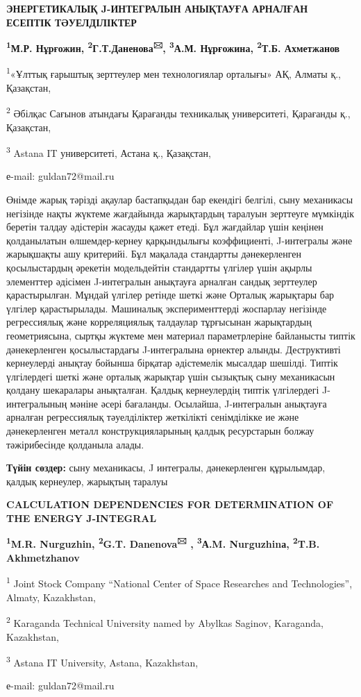 \begin{center}
{\large\bfseries ЭНЕРГЕТИКАЛЫҚ J-ИНТЕГРАЛЫН АНЫҚТАУҒА АРНАЛҒАН ЕСЕПТІК ТӘУЕЛДІЛІКТЕР}

{\bfseries \textsuperscript{1}М.Р. Нұрғожин,
\textsuperscript{2}Г.Т.Даненова\textsuperscript{🖂},
\textsuperscript{3}А.М. Нұрғожина, \textsuperscript{2}Т.Б. Ахметжанов}

\textsuperscript{1}«Ұлттық ғарыштық зерттеулер мен технологиялар
орталығы» АҚ, Алматы қ., Қазақстан,

\textsuperscript{2} Әбілқас Сағынов атындағы Қарағанды техникалық
университеті, Қарағанды қ., Қазақстан,

\textsuperscript{3} Astana IT университеті, Астана қ., Қазақстан,

е-mail: guldan72@mail.ru
\end{center}

Өнімде жарық тәрізді ақаулар бастапқыдан бар екендігі белгілі, сыну
механикасы негізінде нақты жүктеме жағдайында жарықтардың таралуын
зерттеуге мүмкіндік беретін талдау әдістерін жасауды қажет етеді. Бұл
жағдайлар үшін кеңінен қолданылатын өлшемдер-кернеу қарқындылығы
коэффициенті, J-интегралы және жарықшақты ашу критерийі. Бұл мақалада
стандартты дәнекерленген қосылыстардың әрекетін модельдейтін стандартты
үлгілер үшін ақырлы элементтер әдісімен J-интегралын анықтауға арналған
сандық зерттеулер қарастырылған. Мұндай үлгілер ретінде шеткі және
Орталық жарықтары бар үлгілер қарастырылады. Машиналық эксперименттерді
жоспарлау негізінде регрессиялық және корреляциялық талдаулар тұрғысынан
жарықтардың геометриясына, сыртқы жүктеме мен материал параметрлеріне
байланысты типтік дәнекерленген қосылыстардағы J-интегралына өрнектер
алынды. Деструктивті кернеулерді анықтау бойынша бірқатар әдістемелік
мысалдар шешілді. Типтік үлгілердегі шеткі және орталық жарықтар үшін
сызықтық сыну механикасын қолдану шекаралары анықталған. Қалдық
кернеулердің типтік үлгілердегі J-интегралының мәніне әсері бағаланды.
Осылайша, J-интегралын анықтауға арналған регрессиялық тәуелділіктер
жеткілікті сенімділікке ие және дәнекерленген металл конструкцияларының
қалдық ресурстарын болжау тәжірибесінде қолданыла алады.

{\bfseries Түйін сөздер:} сыну механикасы, J интегралы, дәнекерленген
құрылымдар, қалдық кернеулер, жарықтың таралуы

\begin{center}
{\large\bfseries CALCULATION DEPENDENCIES FOR DETERMINATION OF THE ENERGY J-INTEGRAL}

{\bfseries \textsuperscript{1}M.R. Nurguzhin, \textsuperscript{2}G.T.
Danenova\textsuperscript{🖂} , \textsuperscript{3}А.M. Nurguzhinа,
\textsuperscript{2}T.B. Akhmetzhanov}

\textsuperscript{1} Joint Stock Company ``National Center of Space
Researches and Technologies'', Almaty, Kazakhstan,

\textsuperscript{2} Karaganda Technical University named by Abylkas
Saginov, Karaganda, Kazakhstan,

\textsuperscript{3} Astana IT University, Astana, Kazakhstan,

е-mail: guldan72@mail.ru
\end{center}


